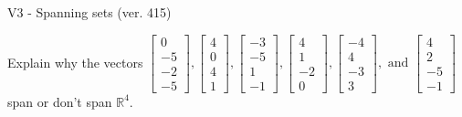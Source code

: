 \begin{exercise}
  \begin{exerciseTitle}V3 - Spanning sets (ver. 415)\end{exerciseTitle}
  \begin{exerciseStatement}
    Explain why the vectors \(\left[\begin{array}{r}
0 \\
-5 \\
-2 \\
-5
\end{array}\right] , \left[\begin{array}{r}
4 \\
0 \\
4 \\
1
\end{array}\right] , \left[\begin{array}{r}
-3 \\
-5 \\
1 \\
-1
\end{array}\right] , \left[\begin{array}{r}
4 \\
1 \\
-2 \\
0
\end{array}\right] , \left[\begin{array}{r}
-4 \\
4 \\
-3 \\
3
\end{array}\right] , \text{ and } \left[\begin{array}{r}
4 \\
2 \\
-5 \\
-1
\end{array}\right]\) span or don't span \(\mathbb{R}^4\). 
	



\end{exerciseStatement}
\end{exercise}
